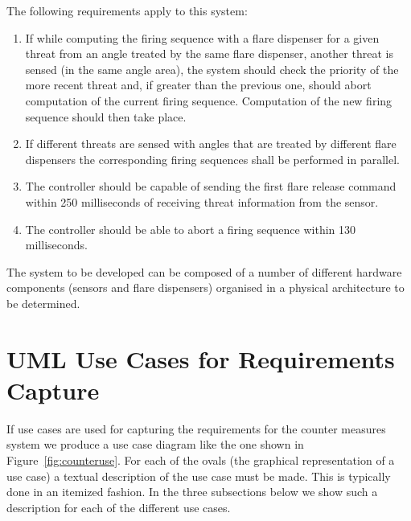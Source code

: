 \documentclass{overturerepchap}
\begin{document}
The following requirements apply to this system:

\begin{enumerate}
\item If while computing the firing sequence with a flare dispenser 
for a given threat from an angle treated by the same flare dispenser,
another threat is sensed (in the same angle area), 
the system should check the priority of the
more recent threat and, if greater than the previous one, should abort
computation of the current firing sequence.  Computation of the new
firing sequence should then take place.
\item If different threats are sensed with angles that are treated by 
different flare dispensers the corresponding firing sequences shall be 
performed in parallel.
\item The controller should be capable of sending the first flare
release command within 250 milliseconds of receiving threat
information from the sensor.\label{timereq34}
\item The controller should be able to abort a firing sequence within
130 milliseconds.
\end{enumerate}

The system to be developed can be composed of a number of different
hardware components (sensors and flare dispensers) organised in a
physical architecture to be determined.

\section{UML Use Cases for Requirements Capture}\label{sec:UMLreq} 
\label{sec:usecase}

If use cases are used for capturing the requirements for the counter
measures system we produce a use case diagram like the one shown in
Figure~\ref{fig:counteruse}. For each of the ovals (the graphical
representation of a use case) a textual description of the use case
must be made. This is typically done in an itemized fashion. In the
three subsections below we show such a description for each of the
different use cases.
\end{document}
